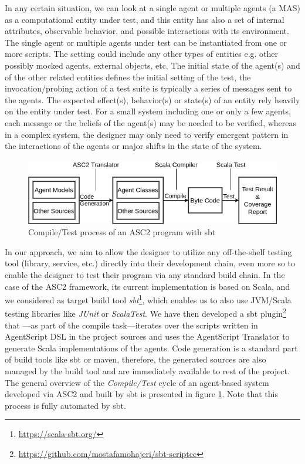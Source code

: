 In any certain situation, we can look at a single agent or multiple agents (a MAS) as a computational entity under test, and this entity has also a set of internal attributes, observable behavior, and possible interactions with its environment. The single agent or multiple agents under test can be instantiated from one or more scripts. The setting could include any other types of entities e.g. other possibly mocked agents, external objects, etc. The initial state of the agent(s) and of the other related entities defines the initial setting of the test, the invocation/probing action of a test suite is typically a series of messages sent to the agents. The expected effect(s), behavior(s) or state(s) of an entity rely heavily on the entity under test. For a small system including one or only a few agents, each message or the beliefs of the agent(s) may be needed to be verified, whereas in a complex system, the designer may only need to verify emergent pattern in the interactions of the agents or major shifts in the state of the system.

\begin{figure}[t!]
  \centering
  \hspace{-5pt}
  \includegraphics[width=0.80\linewidth]{ch_emas/sbt_proc.png}
  \caption{Compile/Test process of an ASC2 program with sbt}
  \label{fig:sbt1}
\end{figure}

In our approach, we aim to allow the designer to utilize any off-the-shelf testing tool (library, service, etc.) directly into their development chain, even more so to enable the designer to test their program via any standard build chain. 
In the case of the ASC2 framework, its current implementation is based on Scala, and we considered as target build tool \textit{sbt}\footnote{\url{https://scala-sbt.org/}}, which enables us to also use JVM/Scala testing libraries like \textit{JUnit} or \textit{ScalaTest}. We have then developed a sbt plugin\footnote{\url{https://github.com/mostafamohajeri/sbt-scriptcc}} that %
---as part of the compile task---iterates over the scripts written in AgentScript DSL in the project sources and uses the AgentScript Translator to generate Scala implementations of the agents. Code generation is a standard part of build tools like sbt or maven, therefore, the generated sources are also managed by the build tool and are immediately available to rest of the project. The general overview of the \textit{Compile/Test} cycle of an agent-based system developed via ASC2 and built by sbt is presented in figure \ref{fig:sbt1}. Note that this process is fully automated by sbt. 


